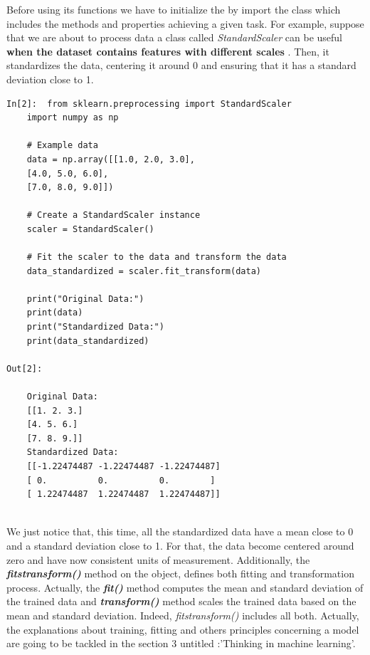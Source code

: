 \documentclass[12pt,a4paper]{report}
\begin{document}
Before using its functions we have to initialize the by import the class which includes the methods and properties achieving a given task. For example, suppose that we are about to process data a class called \textit{StandardScaler} can be useful \textbf{when the dataset contains features with different scales} . Then, it standardizes the data, centering it around 0 and ensuring that it has a standard deviation close to 1.
\begin{lstlisting}[style=stylepython]
In[2]:  from sklearn.preprocessing import StandardScaler
	import numpy as np
	
	# Example data
	data = np.array([[1.0, 2.0, 3.0],
	[4.0, 5.0, 6.0],
	[7.0, 8.0, 9.0]])
	
	# Create a StandardScaler instance
	scaler = StandardScaler()
	
	# Fit the scaler to the data and transform the data
	data_standardized = scaler.fit_transform(data)
	
	print("Original Data:")
	print(data)
	print("Standardized Data:")
	print(data_standardized)  
	
Out[2]:
	
	Original Data:
	[[1. 2. 3.]
	[4. 5. 6.]
	[7. 8. 9.]]
	Standardized Data:
	[[-1.22474487 -1.22474487 -1.22474487]
	[ 0.          0.          0.        ]
	[ 1.22474487  1.22474487  1.22474487]]
	
\end{lstlisting}
  We just notice that, this time, all the standardized data have a mean close to 0 and a standard deviation close to 1. For that, the data become centered around zero and have now consistent units of measurement. \newline
  Additionally, the \textit{\textbf{fitstransform()}} method on the object, defines both fitting and transformation process. Actually, the \textit{\textbf{fit()}} method computes the mean and standard deviation of the trained data and \textit{\textbf{transform()}} method scales the trained data based on the mean and standard deviation. Indeed,  \textit{fitstransform()} includes all both. \newline Actually, the explanations about training, fitting and others principles concerning a model are going to be tackled in the section 3 untitled :'Thinking in machine learning'.
  
\end{document}
